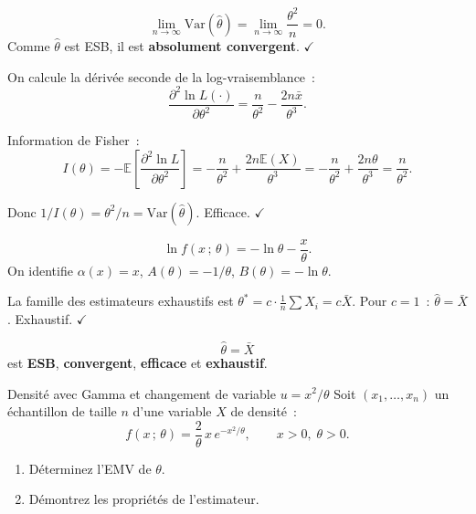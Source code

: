 \documentclass[11pt,a4paper]{article}
\newcommand{\E}{\mathbb{E}}
\newcommand{\Var}{\mathrm{Var}}
\begin{document}
\begin{demobox}[(c) Convergence]
$$\lim_{n\to\infty}\Var(\hat\theta) = \lim_{n\to\infty}\frac{\theta^2}{n} = 0.$$
Comme $\hat\theta$ est ESB, il est \textbf{absolument convergent}. $\checkmark$
\end{demobox}

\begin{demobox}
On calcule la d\'eriv\'ee seconde de la log-vraisemblance~:
$$\frac{\partial^2\ln L(\cdot)}{\partial\theta^2}
  = \frac{n}{\theta^2} - \frac{2n\bar x}{\theta^3}.$$

Information de Fisher~:
$$I(\theta) = -\E\!\left[\frac{\partial^2\ln L}{\partial\theta^2}\right]
  = -\frac{n}{\theta^2}+\frac{2n\E(X)}{\theta^3}
  = -\frac{n}{\theta^2}+\frac{2n\theta}{\theta^3}
  = \frac{n}{\theta^2}.$$

Donc $1/I(\theta) = \theta^2/n = \Var(\hat\theta)$. Efficace. $\checkmark$
\end{demobox}

\begin{demobox}[(e) Exhaustivit\'e]
$$\ln f(x\,;\,\theta) = -\ln\theta - \frac{x}{\theta}.$$
On identifie $\alpha(x)=x$, $A(\theta)=-1/\theta$, $B(\theta)=-\ln\theta$.

La famille des estimateurs exhaustifs est $\theta^*=c\cdot\frac{1}{n}\sum X_i=c\bar X$.
Pour $c=1$~: $\hat\theta=\bar X$. Exhaustif. $\checkmark$
\end{demobox}

\begin{methbox}
$$\boxed{\hat\theta = \bar X}$$
est \textbf{ESB}, \textbf{convergent}, \textbf{efficace} et \textbf{exhaustif}.
\end{methbox}

\begin{exercice}{Densit\'e avec Gamma et changement de variable $u=x^2/\theta$}
Soit $(x_1,\ldots,x_n)$ un \'echantillon de taille $n$ d'une variable $X$ de densit\'e~:
$$f(x\,;\,\theta) = \frac{2}{\theta}\,x\,e^{-x^2/\theta},\qquad x>0,\;\theta>0.$$

\begin{enumerate}[label=\textbf{\arabic*)}]
  \item D\'eterminez l'EMV de $\theta$.
  \item D\'emontrez les propri\'et\'es de l'estimateur.
\end{enumerate}
\end{exercice}
\end{document}
